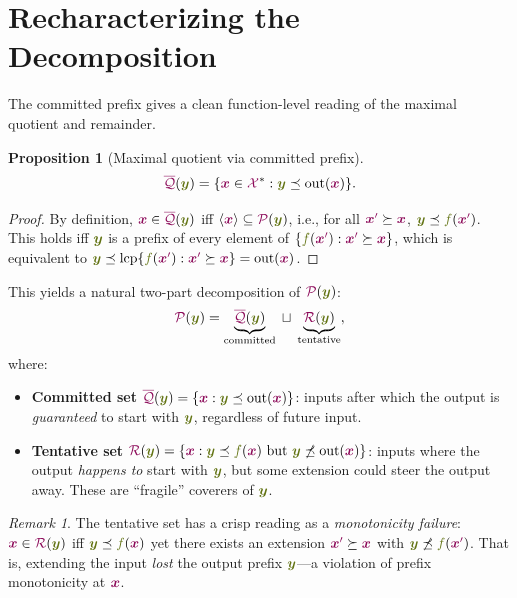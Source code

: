 \documentclass{article}
\newcommand{\preCover}{{\color{TokenColor}\mathcal{P}}}
\newcommand{\maxQuotient}{{\color{TokenColor}\overline{\mathcal{Q}}}}
\newcommand{\Remainder}{{\color{TokenColor}\mathcal{R}}}
\newcommand{\basisSet}[1]{\langle #1\rangle}
\newcommand{\transFnSym}[0]{f}
\newcommand{\transFn}{\ensuremath{{\color{CharacterColor}\transFnSym}}\xspace}
\newcommand{\srcStr}{\ensuremath{{\color{TokenColor}\boldsymbol{x}}}\xspace}
\newcommand{\srcStrp}{\ensuremath{{\color{TokenColor}\boldsymbol{x}^\prime}}\xspace}
\newcommand{\tgtStr}{{\color{CharacterColor}\boldsymbol{y}}}
\newcommand{\srcAlphabet}[0]{{\color{TokenColor}\ensuremath{\mathcal{X}}}\xspace}
\newcommand{\srcStrings}[0]{\ensuremath{\srcAlphabet^*}\xspace}
\newcommand{\committed}{\mathrm{out}}
\newcommand{\lcp}{\mathrm{lcp}}
\theoremstyle{plain}
\newtheorem{proposition}[theorem]{Proposition}
\theoremstyle{definition}
\theoremstyle{remark}
\newtheorem{remark}[theorem]{Remark}
\begin{document}
\section{Recharacterizing the Decomposition}
\label{sec:recharacterize}

The committed prefix gives a clean function-level reading of the maximal
quotient and remainder.

\begin{proposition}[Maximal quotient via committed prefix]
\label{prop:maxQ-committed}
\begin{equation}
  \maxQuotient(\tgtStr) = \{ \srcStr \in \srcStrings : \tgtStr \preceq \committed(\srcStr) \}.
\end{equation}
\end{proposition}
\begin{proof}
By definition, $\srcStr \in \maxQuotient(\tgtStr)$ iff $\basisSet{\srcStr}
\subseteq \preCover(\tgtStr)$, i.e., for all $\srcStrp \succeq \srcStr$,
$\tgtStr \preceq \transFn(\srcStrp)$.  This holds iff $\tgtStr$ is a prefix
of every element of $\{\transFn(\srcStrp) : \srcStrp \succeq \srcStr\}$,
which is equivalent to $\tgtStr \preceq \lcp\{\transFn(\srcStrp) : \srcStrp
\succeq \srcStr\} = \committed(\srcStr)$.
\end{proof}

This yields a natural two-part decomposition of $\preCover(\tgtStr)$:
%
\begin{equation}
\preCover(\tgtStr) = \underbrace{\maxQuotient(\tgtStr)}_{\text{committed}}
  \;\sqcup\; \underbrace{\Remainder(\tgtStr)}_{\text{tentative}},
\end{equation}
%
where:
\begin{itemize}
\item \textbf{Committed set} $\maxQuotient(\tgtStr) = \{\srcStr : \tgtStr \preceq
  \committed(\srcStr)\}$: inputs after which the output is \emph{guaranteed} to
  start with $\tgtStr$, regardless of future input.

\item \textbf{Tentative set} $\Remainder(\tgtStr) = \{\srcStr : \tgtStr \preceq
  \transFn(\srcStr) \text{ but } \tgtStr \not\preceq \committed(\srcStr)\}$:
  inputs where the output \emph{happens to} start with $\tgtStr$, but some
  extension could steer the output away.  These are ``fragile'' coverers of
  $\tgtStr$.
\end{itemize}

\begin{remark}
The tentative set has a crisp reading as a \emph{monotonicity failure}: $\srcStr
\in \Remainder(\tgtStr)$ iff $\tgtStr \preceq \transFn(\srcStr)$ yet there
exists an extension $\srcStrp \succeq \srcStr$ with $\tgtStr \not\preceq
\transFn(\srcStrp)$.  That is, extending the input \emph{lost} the output
prefix $\tgtStr$---a violation of prefix monotonicity at $\srcStr$.
\end{remark}
\end{document}
